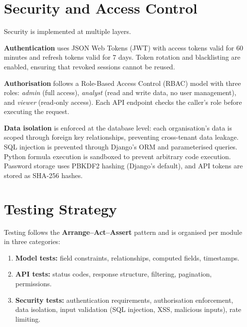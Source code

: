 \section{Security and Access Control}

\noindent
Security is implemented at multiple layers.

\vspace{0.4cm}
\noindent
\textbf{Authentication} uses JSON Web Tokens (JWT)
with access tokens valid for 60 minutes
and refresh tokens valid for 7 days.
Token rotation and blacklisting are enabled,
ensuring that revoked sessions cannot be reused.

\vspace{0.4cm}
\noindent
\textbf{Authorisation} follows a Role-Based Access
Control (RBAC) model with three roles:
\textit{admin} (full access),
\textit{analyst} (read and write data, no user management),
and \textit{viewer} (read-only access).
Each API endpoint checks the caller's role
before executing the request.

\vspace{0.4cm}
\noindent
\textbf{Data isolation} is enforced at the database level:
each organisation's data is scoped
through foreign key relationships,
preventing cross-tenant data leakage.
SQL injection is prevented through Django's ORM
and parameterised queries.
Python formula execution is sandboxed
to prevent arbitrary code execution.
Password storage uses PBKDF2 hashing (Django's default),
and API tokens are stored as SHA-256 hashes.


\section{Testing Strategy}

\noindent
Testing follows the \textbf{Arrange–Act–Assert} pattern
and is organised per module in three categories:

\begin{enumerate}
  \item \textbf{Model tests:} field constraints,
        relationships, computed fields, timestamps.
  \item \textbf{API tests:} status codes,
        response structure, filtering, pagination,
        permissions.
  \item \textbf{Security tests:} authentication requirements,
        authorisation enforcement, data isolation,
        input validation (SQL injection, XSS,
        malicious inputs), rate limiting.
\end{enumerate}


